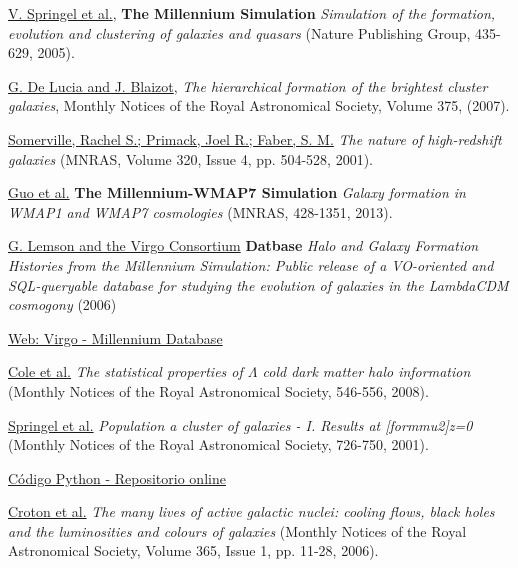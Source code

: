 \begin{thebibliography}{9}
\href{https://ui.adsabs.harvard.edu/abs/2005Natur.435..629S/abstract}{V. Springel et al.},
\textbf{The Millennium Simulation}
\textit{Simulation of the formation, evolution and clustering of galaxies and quasars}
(Nature Publishing Group, 435-629, 2005).

\href{https://ui.adsabs.harvard.edu/abs/2007MNRAS.375....2D/abstract}{G. De Lucia and J. Blaizot},
\textit{The hierarchical formation of the brightest cluster galaxies},
Monthly Notices of the Royal Astronomical Society, Volume 375, (2007).

\href{https://ui.adsabs.harvard.edu/abs/2001MNRAS.320..504S/abstract}{Somerville, Rachel S.; Primack, Joel R.; Faber, S. M.} 
\textit{The nature of high-redshift galaxies}
(MNRAS, Volume 320, Issue 4, pp. 504-528, 2001).

\href{https://ui.adsabs.harvard.edu/abs/2013MNRAS.428.1351G/abstract}{Guo et al.} 
\textbf{The Millennium-WMAP7 Simulation}
\textit{Galaxy formation in WMAP1 and WMAP7 cosmologies}
(MNRAS, 428-1351, 2013).

\href{https://ui.adsabs.harvard.edu/abs/2006astro.ph..8019L/abstract}{G. Lemson and the Virgo Consortium} 
\textbf{Datbase}
\textit{Halo and Galaxy Formation Histories from the Millennium Simulation: Public release of a VO-oriented and SQL-queryable database for studying the evolution of galaxies in the LambdaCDM cosmogony}
(2006)

\href{http://gavo.mpa-garching.mpg.de/Millennium/}{Web: Virgo - Millennium Database}

\href{https://ui.adsabs.harvard.edu/abs/2008MNRAS.383..546C/abstract}{Cole et al.} 
\textit{The statistical properties of $\Lambda$ cold dark matter halo information}
(Monthly Notices of the Royal Astronomical Society, 546-556, 2008).

\href{https://ui.adsabs.harvard.edu/abs/2001MNRAS.328..726S/abstract}{Springel et al.} 
\textit{Population a cluster of galaxies - I. Results at [formmu2]z=0}
(Monthly Notices of the Royal Astronomical Society, 726-750, 2001).

\href{https://github.com/Labalor/MillenniumSimulation/}{Código Python - Repositorio online}

\href{https://ui.adsabs.harvard.edu/abs/2006MNRAS.365...11C/abstract}{Croton et al.}
\textit{The many lives of active galactic nuclei: cooling flows, black holes and the luminosities and colours of galaxies}
(Monthly Notices of the Royal Astronomical Society, Volume 365, Issue 1, pp. 11-28, 2006).

\end{thebibliography}

